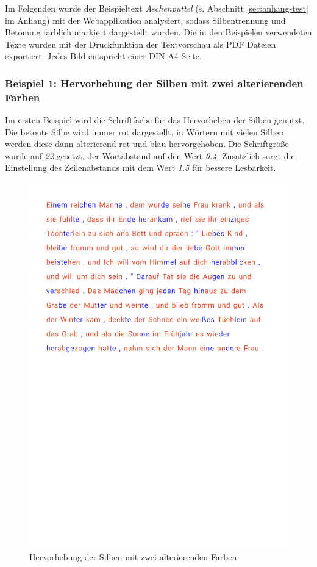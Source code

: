 Im Folgenden wurde der Beispieltext \textit{Aschenputtel} (s. Abschnitt \ref{sec:anhang-test} im Anhang) mit der Webapplikation analysiert, sodass Silbentrennung und Betonung farblich markiert dargestellt wurden. Die in den Beispielen verwendeten Texte wurden mit der Druckfunktion der Textvorschau als PDF Dateien exportiert. Jedes Bild entspricht einer DIN A4 Seite.

\subsubsection{Beispiel 1: Hervorhebung der Silben mit zwei alterierenden Farben}

Im ersten Beispiel wird die Schriftfarbe für das Hervorheben der Silben genutzt. Die betonte Silbe wird immer rot dargestellt, in Wörtern mit vielen Silben werden diese dann alterierend rot und blau hervorgehoben. Die Schriftgröße wurde auf \textit{22} gesetzt, der Wortabstand auf den Wert \textit{0.4}. Zusätzlich sorgt die Einstellung des Zeilenabstands mit dem Wert \textit{1.5} für bessere Lesbarkeit.

\begin{figure}[h!]
	\centering
	\includegraphics[width=.7\linewidth, frame]{figures/evaluation/annotation1}
	\caption{Hervorhebung der Silben mit zwei alterierenden Farben}
	\label{fig:evaluation-ex1}
\end{figure}
\newpage

